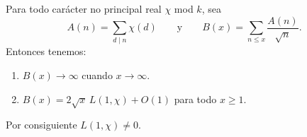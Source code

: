 \documentclass[12pt,a4paper]{book}
\begin{document}
    \begin{teorema}
        Para todo carácter no principal real $\chi$ mod $k$, sea
        \begin{equation*}
            A(n)=\sum_{d\mid n}\chi(d)\qquad\text{y}\qquad B(x)=\sum_{n\leq x}\frac{A(n)}{\sqrt{n}}.
        \end{equation*}
        Entonces tenemos:
        \begin{enumerate}
            \item[(a)] $B(x)\to\infty$ cuando $x\to\infty$.
            \item[(b)] $B(x)=2\sqrt{x}\,L(1,\chi)+O(1)$ para todo $x\geq1$.
        \end{enumerate}
        Por consiguiente $L(1,\chi)\neq0$.
    \end{teorema}
\end{document}
